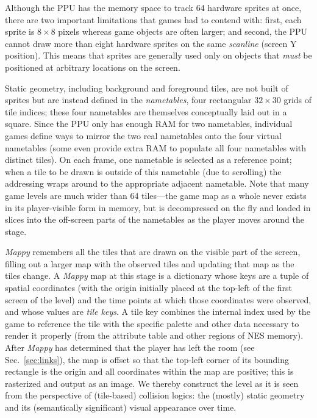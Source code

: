 \documentclass[a4paper]{article}
\begin{document}
Although the PPU has the memory space to track 64 hardware sprites at once, there are two important limitations that games had to contend with: first, each sprite is \(8 \times 8\) pixels whereas game objects are often larger; and second, the PPU cannot draw more than eight hardware sprites on the same \emph{scanline} (screen Y position).
This means that sprites are generally used only on objects that \emph{must} be positioned at arbitrary locations on the screen.

Static geometry, including background and foreground tiles, are not built of sprites but are instead defined in the \emph{nametables}, four rectangular \(32 \times 30\) grids of tile indices; these four nametables are themselves conceptually laid out in a square.
Since the PPU only has enough RAM for two nametables, individual games define ways to mirror the two real nametables onto the four virtual nametables (some even provide extra RAM to populate all four nametables with distinct  tiles).
On each frame, one nametable is selected as a reference point; when a tile to be drawn is outside of this nametable (due to scrolling) the addressing wraps around to the appropriate adjacent nametable.
Note that many game levels are much wider than 64 tiles---the game map as a whole never exists in its player-visible form in memory, but is decompressed on the fly and loaded in slices into the off-screen parts of the nametables as the player moves around the stage.

\emph{Mappy} remembers all the tiles that are drawn on the visible part of the screen, filling out a larger map with the observed tiles and updating that map as the tiles change.
A \emph{Mappy} map at this stage is a dictionary whose keys are a tuple of spatial coordinates (with the origin initially placed at the top-left of the first screen of the level) and the time points at which those coordinates were observed, and whose values are \emph{tile keys}.
A tile key combines the internal index used by the game to reference the tile with the specific palette and other data necessary to render it properly (from the attribute table and other regions of NES memory).
After \emph{Mappy} has determined that the player has left the room (see Sec.~\ref{sec:links}), the map is offset so that the top-left corner of its bounding rectangle is the origin and all coordinates within the map are positive; this is rasterized and output as an image.
We thereby construct the level as it is seen from the perspective of (tile-based) collision logics: the (mostly) static geometry and its (semantically significant) visual appearance over time.
\end{document}

